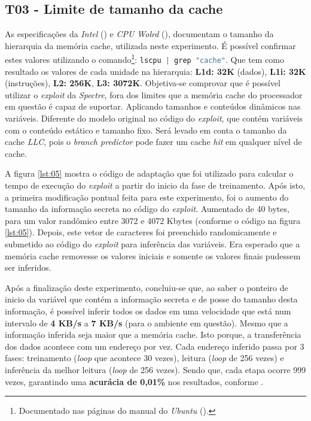 \documentclass[
	article,			    %
	12pt,				    %
	oneside,			    %
	a4paper,			    %
	chapter=TITLE,		    %
	section=TITLE,		    %
	subsection=TITLE,	    %
	english,			    %
	brazil,				    %
	sumario=tradicional
]{abntex2}
\begin{document}
\begin{comment}
explicar mais sobre o que é "contexto" nesse sentindo
\end{comment}

\subsection{T03 - Limite de tamanho da cache}
As especificações da \emph{Intel} (\citeyear{Intel2019Corei3}) e \emph{CPU Wolrd} (\citeyear{CPU2016Corei3}), documentam o tamanho da hierarquia da memória cache, utilizada neste experimento. É possível confirmar estes valores utilizando o comando\footnote{Documentado nas páginas do manual do \emph{Ubuntu} (\citeyear{Ubuntu2019Lscpu}).}: \lstinline[language=C, style=c]{lscpu | grep "cache"}. Que tem como resultado os valores de cada unidade na hierarquia: \textbf{L1d: 32K} (dados), \textbf{L1i: 32K} (instruções), \textbf{L2: 256K}, \textbf{L3: 3072K}. Objetiva-se comprovar que é possível utilizar o \emph{exploit} da \emph{Spectre}, fora dos limites que a memória cache do processador em questão é capaz de suportar. Aplicando tamanhos e conteúdos dinâmicos nas variáveis. Diferente do modelo original no código do \emph{exploit}, que contém variáveis com o conteúdo estático e tamanho fixo. Será levado em conta o tamanho da cache \emph{LLC}, pois o \emph{branch predictor} pode fazer um cache \emph{hit} em qualquer nível de cache.

A figura \ref{lst:05} mostra o código de adaptação que foi utilizado para calcular o tempo de execução do \emph{exploit} a partir do inicio da fase de treinamento. Após isto, a primeira modificação pontual feita para este experimento, foi o aumento do tamanho da informação secreta no código do \emph{exploit}. Aumentado de 40 bytes, para um valor randômico entre 3072 e 4072 Kbytes (conforme o código na figura \ref{lst:05}). Depois, este vetor de caracteres foi preenchido randomicamente e submetido ao código do \emph{exploit} para inferência das variáveis. Era esperado que a memória cache removesse os valores iniciais e somente os valores finais pudessem ser inferidos.



Após a finalização deste experimento, concluiu-se que, ao saber o ponteiro de inicio da variável que contém a informação secreta e de posse do tamanho desta informação, é possível inferir todos os dados em uma velocidade que está num intervalo de \textbf{4 KB/s} a \textbf{7 KB/s} (para o ambiente em questão). Mesmo que a informação inferida seja maior que a memória cache. Isto porque, a transferência dos dados acontece com um endereço por vez. Cada endereço inferido passa por 3 fases: treinamento (\emph{loop} que acontece 30 vezes), leitura (\emph{loop} de 256 vezes) e inferência da melhor leitura (\emph{loop} de 256 vezes). Sendo que, cada etapa ocorre 999 vezes, garantindo uma \textbf{acurácia de 0,01\%} nos resultados, conforme .
\end{document}
